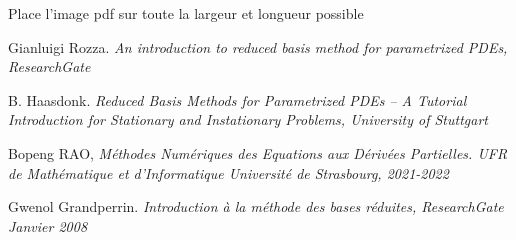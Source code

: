\documentclass[12pt]{article}
\begin{document}
Place l'image pdf sur toute la largeur et longueur possible







\begin{thebibliography}{9}

Gianluigi Rozza.  \emph{An introduction to reduced basis method for parametrized PDEs, ResearchGate}

B. Haasdonk.  \emph{Reduced Basis Methods for Parametrized PDEs –
A Tutorial Introduction for Stationary and
Instationary Problems, University of Stuttgart  } 



Bopeng RAO,  \emph{ Méthodes Numériques
des Equations aux Dérivées Partielles. UFR de Mathématique et d’Informatique
Université de Strasbourg, 2021-2022 }

Gwenol Grandperrin.  \emph{Introduction à la méthode des bases réduites, ResearchGate Janvier 2008 }

\end{thebibliography}
\end{document}
